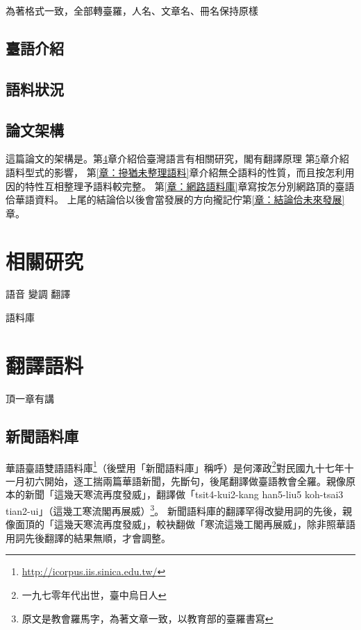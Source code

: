 \documentclass[final,oneside,onecolumn,12pt,a4paper]{book}%
\begin{document}
為著格式一致，全部轉臺羅，人名、文章名、冊名保持原樣

\section{臺語介紹}
\label{節：臺語介紹}

\section{語料狀況}
\label{節：語料狀況}


\section{論文架構}
\label{節：論文架構}

這篇論文的架構是。第\ref{章：相關研究}章介紹佮臺灣語言有相關研究，閣有翻譯原理
第\ref{章：翻譯語料}章介紹語料型式的影響，
第\ref{章：摻猶未整理語料}章介紹無仝語料的性質，而且按怎利用因的特性互相整理予語料較完整。
第\ref{章：網路語料庫}章寫按怎分別網路頂的臺語佮華語資料。
上尾的結論佮以後會當發展的方向攏記佇第\ref{章：結論佮未來發展}章。

\chapter{相關研究}
\label{章：相關研究}
語音
變調
翻譯

語料庫


\chapter{翻譯語料}
\label{章：翻譯語料}

頂一章有講

\section{新聞語料庫}
\label{節：新聞語料庫}
華語臺語雙語語料庫\footnote{\url{http://icorpus.iis.sinica.edu.tw/}}（後壁用「新聞語料庫」稱呼）是何澤政\footnote{一九七零年代出世，臺中烏日人}對民國九十七年十一月初六開始，逐工揣兩篇華語新聞，先斷句，後尾翻譯做臺語教會全羅。親像原本的新聞「這幾天寒流再度發威」，翻譯做「tsit4-kui2-kang han5-liu5 koh-tsai3 tian2-ui」（這幾工寒流閣再展威）\footnote{原文是教會羅馬字，為著文章一致，以教育部的臺羅書寫}。
新聞語料庫的翻譯罕得改變用詞的先後，親像面頂的「這幾天寒流再度發威」，較袂翻做「寒流這幾工閣再展威」，除非照華語用詞先後翻譯的結果無順，才會調整。
\end{document}
